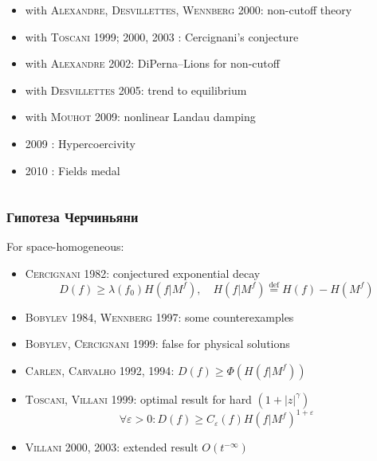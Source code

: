 \documentclass[mathserif]{beamer} %
\newcommand{\eqdef}{\overset{\mathrm{def}}{=}}
\newcommand{\OO}[1]{O(#1)}
\newcommand{\Cite}[2][]{\alert{\textsc{#2 #1}}}
\renewcommand{\epsilon}{\varepsilon}
\begin{document}
\begin{frame}
\begin{columns}
\begin{column}{0.8\textwidth}
\begin{itemize}
            \item with \Cite[2000]{Alexandre, Desvillettes, Wennberg}: non-cutoff theory
            \item with \Cite[1999]{Toscani}; \Cite{2000, 2003}: Cercignani's conjecture
            \item with \Cite[2002]{Alexandre}: DiPerna--Lions for non-cutoff
            \item with \Cite[2005]{Desvillettes}: trend to equilibrium
            \item with \Cite[2009]{Mouhot}: nonlinear Landau damping
            \item \Cite{2009}: Hypercoercivity
            \item \Cite{2010}: Fields medal
        \end{itemize}
    \end{column}
    \end{columns}
\end{frame}

\begin{frame}
    \frametitle{Гипотеза Черчиньяни}
    For space-homogeneous:
    \begin{itemize}
        \item \Cite[1982]{Cercignani}: conjectured exponential decay
        \[ D(f) \geq \lambda(f_0) H(f|M^f), \quad  H(f|M^f) \eqdef H(f) - H(M^f) \]
        \item \Cite[1984]{Bobylev}, \Cite[1997]{Wennberg}: some counterexamples
        \item \Cite[1999]{Bobylev, Cercignani}: false for physical solutions
        \item \Cite[1992, 1994]{Carlen, Carvalho}: \( D(f) \geq \Phi(H(f|M^f)) \)
        \item \Cite[1999]{Toscani, Villani}: optimal result for hard \((1+|z|^\gamma)\)
        \[ \forall\epsilon>0: D(f) \geq C_\epsilon(f) H(f|M^f)^{1+\epsilon}\]
        \item \Cite[2000, 2003]{Villani}: extended result \(\OO{t^{-\infty}}\)
    \end{itemize}
\end{frame}
\end{document}

